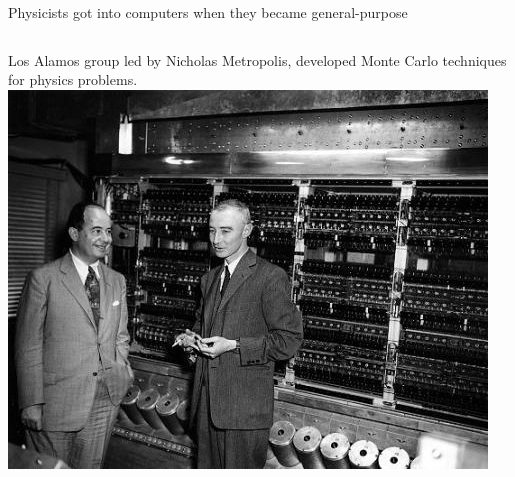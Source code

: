 \documentclass[aspectratio=169]{beamer}
\begin{document}
\begin{frame}{Physicists got into computers when they became general-purpose}
\begin{columns}
\vspace{0.25 cm}
Los Alamos group led by Nicholas Metropolis, developed Monte Carlo techniques for physics problems.
\includegraphics[width=\linewidth]{neumann_oppie.jpg}
\end{columns}
\end{frame}
\end{document}
